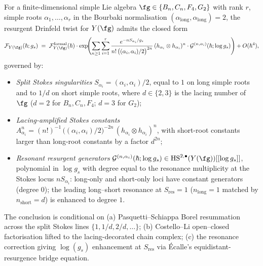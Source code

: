 \begin{theorem}
\label{thm:Yfg-resurgent-Drinfeld-twist-non-simply-laced}
For a finite-dimensional simple Lie algebra
$\fg \in \{B_n, C_n, F_4, G_2\}$ with rank $r$, simple roots
$\alpha_1, \dots, \alpha_r$ in the Bourbaki normalisation
$(\alpha_{\mathrm{long}}, \alpha_{\mathrm{long}}) = 2$, the resurgent
Drinfeld twist for $Y(\fg)$ admits the closed form
\[
 \mathcal{F}_{Y(\fg)}(\hbar; g_s)
 \;=\; \mathcal{F}^{\mathrm{formal}}_{Y(\fg)}(\hbar)
 \cdot \exp\!\Biggl(\sum_{n \ge 1}\sum_{i = 1}^{r}
 \frac{e^{-n S_{\alpha_i}/g_s}}{n!\,
 \bigl((\alpha_i, \alpha_i)/2\bigr)^{2n}}\,
 (h_{\alpha_i} \otimes h_{\alpha_i})^n
 \cdot \mathcal{G}^{(n, \alpha_i)}(\hbar; \log g_s)\Biggr)
 + O(\hbar^4),
\]
governed by:
\begin{itemize}
\item \emph{Split Stokes singularities}
 $S_{\alpha_i} = (\alpha_i, \alpha_i)/2$, equal to $1$ on long
 simple roots and to $1/d$ on short simple roots, where
 $d \in \{2, 3\}$ is the lacing number of $\fg$
 \textup{(}$d = 2$ for $B_n, C_n, F_4$; $d = 3$ for $G_2$\textup{);}
\item \emph{Lacing-amplified Stokes constants}
 $A^n_{\alpha_i} = (n!)^{-1}\,
 \bigl((\alpha_i, \alpha_i)/2\bigr)^{-2n}\,
 (h_{\alpha_i} \otimes h_{\alpha_i})^n$,
 with short-root constants larger than long-root constants by a
 factor $d^{2n}$;
\item \emph{Resonant resurgent generators}
 $\mathcal{G}^{(n, \alpha_i)}(\hbar; \log g_s)
 \in \mathrm{HS}^{2, \bullet}(Y(\fg))[[\log g_s]]$,
 polynomial in $\log g_s$ with degree equal to the resonance
 multiplicity at the Stokes locus $n S_{\alpha_i}$: long-only
 and short-only loci have constant generators \textup{(}degree
 $0$\textup{);} the leading long--short resonance at
 $S_{\mathrm{res}} = 1$ \textup{(}$n_{\mathrm{long}} = 1$ matched
 by $n_{\mathrm{short}} = d$\textup{)} is enhanced to degree $1$.
\end{itemize}
The conclusion is conditional on
\textup{(a)} Pasquetti--Schiappa Borel resummation across the split
Stokes lines $\{1, 1/d, 2/d, \dots\}$;
\textup{(b)} Costello--Li open--closed factorisation lifted to the
lacing-decorated chain complex;
\textup{(c)} the resonance correction giving $\log(g_s)$ enhancement
at $S_{\mathrm{res}}$ via Écalle's equidistant-resurgence bridge
equation.
\end{theorem}

